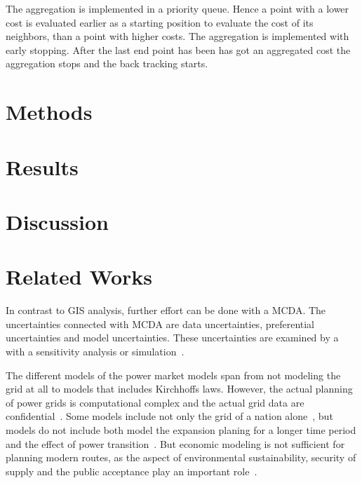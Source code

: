 \documentclass[acmtog]{acmart}
\begin{document}
	The aggregation is implemented in a priority queue. 
	Hence a point with a lower cost is evaluated earlier as a starting position to evaluate the cost of its neighbors, than a point with higher costs.
	The aggregation is implemented with early stopping. 
	After the last end point has been has got an aggregated cost the aggregation stops and the back tracking starts.
	
	

	\section{Methods}\label{sec:methods}
	

	\section{Results}\label{sec:results}
	
	
	\section{Discussion}\label{sec:discussion}
	

	\section{Related Works}\label{sec:related-works}
	In contrast to GIS analysis, further effort can be done with a \acrfull{MCDA}.
	The uncertainties connected with \acrshort{MCDA} are data uncertainties, preferential uncertainties and model uncertainties.
	These uncertainties are examined by a with a sensitivity analysis  or simulation~\cite{butler_simulation_1997}.
	
	The different models of the power market models span from not modeling the grid at all to models that includes Kirchhoffs laws.
	However, the actual planning of power grids is computational complex and the actual grid data are confidential~\cite{bertsch_participatory_2016}.
	Some models include not only the grid of a nation alone~\cite{dietrich_will_2010}, but models do not include both model the expansion planing for a longer time period and the effect of power transition~\cite{bertsch_participatory_2016}.
	But economic modeling is not sufficient for planning modern routes, as the aspect of environmental sustainability, security of supply and the public acceptance play an important role~\cite{hauff_gesellschaftliche_2011}.
\end{document}
